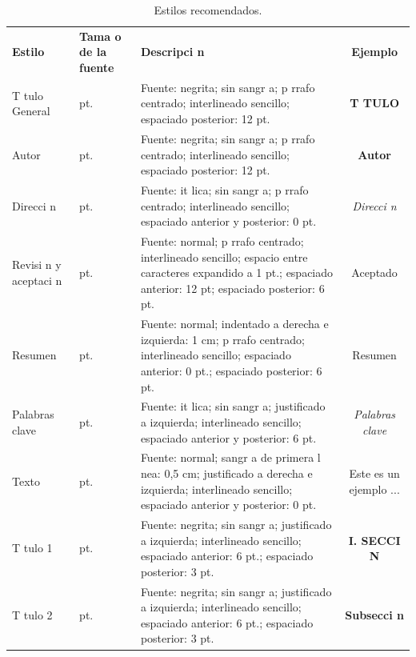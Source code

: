 \documentclass{article}
\begin{document}
\begin{table}[ht]
\caption{Estilos recomendados.}
\label{tab_01}
    \centering
    \small
    \begin{tabular}{|m{2cm}|m{1.5cm}|m{7.8cm}|c|}
    \hline
    \centering
    \textbf{Estilo} & \centering\textbf{Tama o de la fuente} & \centering\textbf{Descripci n} & \textbf{Ejemplo} \\ 
    \thickhline
    \centering T tulo General & \centering 14 pt. & Fuente: negrita; sin sangr a; p rrafo centrado; interlineado sencillo; espaciado posterior: 12 pt.  &  \large\textbf{T TULO} \\ 
    \hline
    \centering Autor & \centering 11 pt. &  Fuente: negrita; sin sangr a; p rrafo centrado; interlineado sencillo; espaciado posterior: 12 pt. & \large\textbf{{Autor}} \\ 
    \hline
    \centering Direcci n & \centering 9 pt. & Fuente: it lica; sin sangr a; p rrafo centrado; interlineado sencillo; espaciado anterior y posterior: 0 pt.  &  \small\textit{{Direcci n}}\\
    \hline
    \centering Revisi n y aceptaci n & \centering 9 pt.  & Fuente: normal; p rrafo centrado; interlineado sencillo; espacio entre caracteres expandido a 1 pt.; espaciado anterior: 12 pt; espaciado posterior: 6 pt.  & \small{Aceptado}\\
    \hline
    \centering Resumen & \centering 9 pt. & Fuente: normal; indentado a derecha e izquierda: 1 cm; p rrafo centrado; interlineado sencillo; espaciado anterior: 0 pt.; espaciado posterior: 6 pt.  & \small{Resumen}  \\
    \hline
    \centering Palabras clave  &  \centering 9 pt.  & Fuente: it lica; sin sangr a; justificado a izquierda; interlineado sencillo; espaciado anterior y posterior: 6 pt.  & \small{\textit{Palabras clave}}  \\
    \hline
    \centering Texto  & \centering 10 pt.  & Fuente: normal; sangr a de primera l nea: 0,5 cm; justificado a derecha e izquierda; interlineado sencillo; espaciado anterior y posterior: 0 pt.  & Este es un ejemplo ...  \\
    \hline
    \centering T tulo 1  & \centering 10 pt. &  Fuente: negrita; sin sangr a; justificado a izquierda; interlineado sencillo; espaciado anterior: 6 pt.; espaciado posterior: 3 pt.   &  \textbf{I. SECCI N} \\
    \hline
    \centering T tulo 2 & \centering 10 pt.  & Fuente: negrita; sin sangr a; justificado a izquierda; interlineado sencillo; espaciado anterior: 6 pt.; espaciado posterior: 3 pt.  & \textbf{Subsecci n}  \\

\end{tabular}
\end{table}
\end{document}
